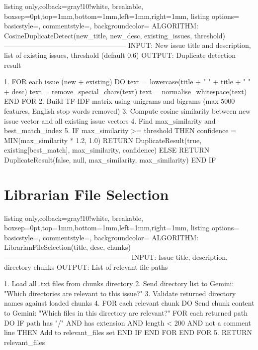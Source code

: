 \begin{tcblisting}{listing only,colback=gray!10!white, breakable, boxsep=0pt,top=1mm,bottom=1mm,left=1mm,right=1mm,
listing options={
basicstyle=\small\ttfamily,
commentstyle=\color{gray},
backgroundcolor=\color{gray!25}}}
ALGORITHM: CosineDuplicateDetect(new_title, new_desc,
                                 existing_issues, threshold)
-----------------------------------------------------
INPUT:  New issue title and description,
        list of existing issues, threshold (default 0.6)
OUTPUT: Duplicate detection result

1. FOR each issue (new + existing) DO
     text = lowercase(title + " " + title + " " + desc)
     text = remove_special_chars(text)
     text = normalise_whitespace(text)
   END FOR
2. Build TF-IDF matrix using unigrams and bigrams
   (max 5000 features, English stop words removed)
3. Compute cosine similarity between new issue
   vector and all existing issue vectors
4. Find max_similarity and best_match_index
5. IF max_similarity >= threshold THEN
     confidence = MIN(max_similarity * 1.2, 1.0)
     RETURN DuplicateResult(true, existing[best_match],
                            max_similarity, confidence)
   ELSE
     RETURN DuplicateResult(false, null,
                            max_similarity, max_similarity)
   END IF
\end{tcblisting}

\section{Librarian File Selection}

\begin{tcblisting}{listing only,colback=gray!10!white, breakable, boxsep=0pt,top=1mm,bottom=1mm,left=1mm,right=1mm,
listing options={
basicstyle=\small\ttfamily,
commentstyle=\color{gray},
backgroundcolor=\color{gray!25}}}
ALGORITHM: LibrarianFileSelection(title, desc, chunks)
------------------------------------------------------
INPUT:  Issue title, description, directory chunks
OUTPUT: List of relevant file paths

1. Load all .txt files from chunks directory
2. Send directory list to Gemini:
   "Which directories are relevant to this issue?"
3. Validate returned directory names against loaded chunks
4. FOR each relevant chunk DO
     Send chunk content to Gemini:
     "Which files in this directory are relevant?"
     FOR each returned path DO
       IF path has "/" AND has extension
          AND length < 200
          AND not a comment line THEN
         Add to relevant_files set
       END IF
     END FOR
   END FOR
5. RETURN relevant_files
\end{tcblisting}
